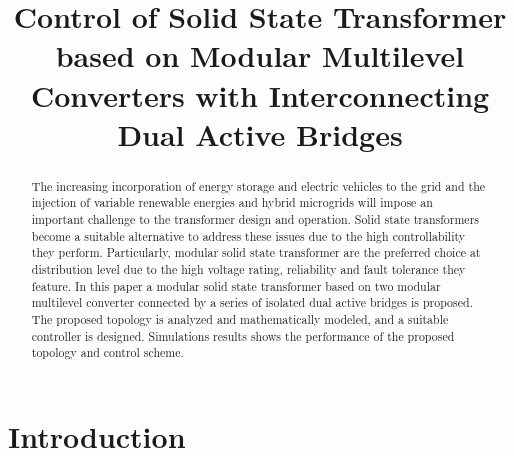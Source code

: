 \documentclass[conference]{IEEEtran}
\begin{document}
\title{Control of Solid State Transformer based on  Modular Multilevel Converters with Interconnecting Dual Active Bridges}
\author{
%
}
 

\maketitle

\begin{abstract}
The increasing incorporation of energy storage and electric vehicles to the grid and the  injection of variable renewable energies and hybrid microgrids will impose an important challenge to the transformer design and operation. Solid state transformers  become a suitable alternative to address these issues due to the high controllability they perform. Particularly, modular solid state transformer are the preferred choice at distribution level due to the high voltage rating, reliability and fault tolerance they feature. In this paper a modular solid state transformer based on two modular multilevel converter connected by a series of isolated dual active bridges is proposed. The proposed topology is analyzed and mathematically modeled, and a suitable controller is designed. Simulations results shows the performance of the proposed topology and control scheme.
\end{abstract}



\section{Introduction}
 
\end{document}

